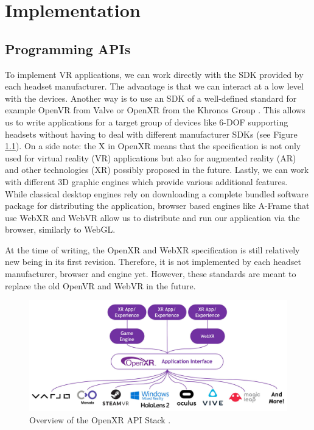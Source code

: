 \chapter{Implementation}
\label{chap:Impl}
\section{Programming APIs}

To implement VR applications, we can work directly with the SDK provided by each headset manufacturer. The advantage is that we can interact at a low level with the devices. 
Another way is to use an SDK of a well-defined standard for example OpenVR from Valve \cite{OpenVRValve} or OpenXR from the Khronos Group \cite{khronosGroupOpenXR}. This allows us to write applications for a target group of devices like 6-DOF supporting headsets without having to deal with different manufacturer SDKs (see Figure \ref{fig:openxr-overview}). On a side note: the X in OpenXR means that the specification is not only used for virtual reality (VR) applications but also for augmented reality (AR) and other technologies (XR) possibly proposed in the future.
Lastly, we can work with different 3D graphic engines which provide various additional features. While classical desktop engines rely on downloading a complete bundled software package for distributing the application, browser based engines like A-Frame \cite{aframe} that use WebXR \cite{webxr} and WebVR \cite{webvr} allow us to distribute and run our application via the browser, similarly to WebGL.

At the time of writing, the OpenXR and WebXR specification is still relatively new being in its first revision. Therefore, it is not implemented by each headset manufacturer, browser and engine yet. However, these standards are meant to replace the old OpenVR and WebVR in the future.

\begin{figure}[!hbt]
    \centering
    \includegraphics[width=\textwidth]{graphics/openXR-overview.jpg}
    \caption{Overview of the OpenXR API Stack \cite{khronosGroupOpenXR}.}
    \label{fig:openxr-overview}
\end{figure}

